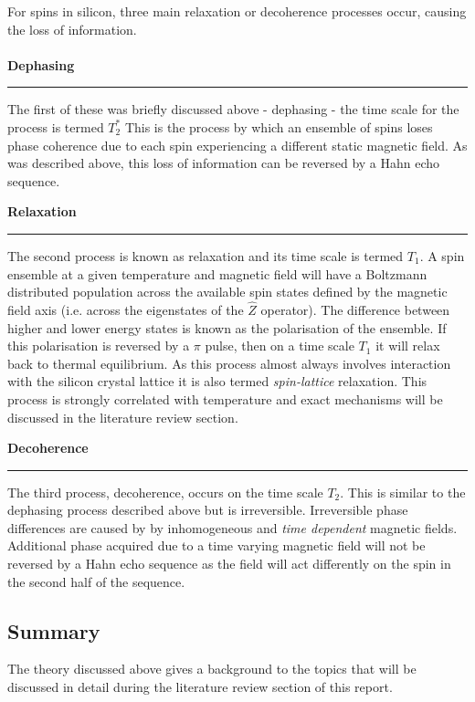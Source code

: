 For spins in silicon, three main relaxation or decoherence processes occur, causing the loss of information.
\\
\\
\textbf{Dephasing}
\\
\noindent\rule{\columnwidth}{1pt}
\begin{adjustwidth}{1.5cm}{}
The first of these was briefly discussed above - dephasing - the time scale for the process is termed \textbf{$T_2^*$}
This is the process by which an ensemble of spins loses phase coherence due to each spin experiencing a different static magnetic field.
As was described above, this loss of information can be reversed by a Hahn echo sequence.
\end{adjustwidth}
\textbf{Relaxation} \newline
\noindent\rule{\columnwidth}{1pt}
\begin{adjustwidth}{1.5cm}{}
The second process is known as relaxation and its time scale is termed $T_1$. A spin ensemble at a given temperature and magnetic field will have a Boltzmann distributed population across the available spin states defined by the magnetic field axis (i.e. across the eigenstates of the $\hat{Z}$ operator).
The difference between higher and lower energy states is known as the polarisation of the ensemble.
If this polarisation is reversed by a $\pi$ pulse, then on a time scale $T_1$ it will relax back to thermal equilibrium.
As this process almost always involves interaction with the silicon crystal lattice it is also termed \textit{spin-lattice} relaxation.
This process is strongly correlated with temperature and exact mechanisms will be discussed in the literature review section.
\end{adjustwidth}
\textbf{Decoherence}
\\
\noindent\rule{\columnwidth}{1pt}
\begin{adjustwidth}{1.5cm}{}
The third process, decoherence, occurs on the time scale $T_2$. 
This is similar to the dephasing process described above but is irreversible. 
Irreversible phase differences are caused by by inhomogeneous and \textit{time dependent} magnetic fields. 
Additional phase acquired due to a time varying magnetic field will not be reversed by a Hahn echo sequence as the field will act differently on the spin in the second half of the sequence.
\end{adjustwidth}

\subsection{Summary}

The theory discussed above gives a background to the topics that will be discussed in detail during the literature review section of this report.
